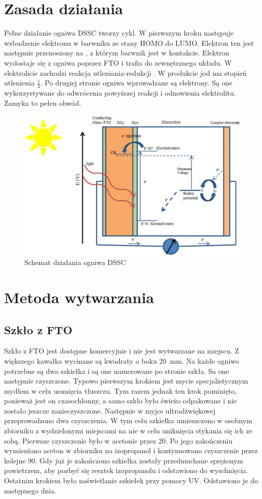 \documentclass[a4, 12pt]{article}
\begin{document}
	\section{Zasada działania}
	Pełne działanie ogniwa DSSC tworzy cykl. W pierwszym kroku następuje wzbudzenie elektronu w barwniku ze stany HOMO do LUMO. Elektron ten jest następnie przenoszony na , z którym barwnik jest w kontakcie. Elektron wydostaje się z ogniwa poprzez FTO i trafia do zewnętrznego układu. W elektrolicie zachodzi reakcja utleniania-redukcji . W produkcie jod ma stopień utlenienia $\frac{1}{3}$. Po drugiej stronie ogniwa wprowadzane są elektrony. Są one wykorzystywane do odwrócenia powyższej reakcji i odnowienia elektrolitu. Zamyka to pełen obwód. 
	\begin{figure}[H]
		\centering
		\includegraphics[width=\textwidth]{dssc.png}
		\caption{Schemat działania ogniwa DSSC \cite{dssc;fundamentals}}
	\end{figure}
	
	\section{Metoda wytwarzania}
	\subsection{Szkło z FTO}
	Szkło z FTO jest dostępne komercyjnie i nie jest wytwarzane na miejscu. Z większego kawałka wycinane są kwadraty o boku \qty{20}{\mm}. Na każde ogniwo potrzebne są dwa szkiełka i są one numerowane po stronie szkła. Sa one następnie czyszczone. Typowo pierwszym krokiem jest mycie specjalistycznym mydłem w celu usunięcia tłuszczu. Tym razem jednak ten krok pominięto, ponieważ jest on czasochłonny, a samo szkło było świeżo odpakowane i nie zostało jeszcze zanieczyszczone. Następnie w myjce ultradźwiękowej przeprowadzono dwa czyszczenia. W tym celu szkiełka umieszczono w osobnym zbiorniku z wydzielonymi miejscami na nie w celu uniknięcia stykania się ich ze sobą. Pierwsze czyszczenie było w acetonie przez \qty{20}{\min}. Po jego zakończeniu wymieniono aceton w zbiorniku na izopropanol i kontynuowano czyszczenie przez kolejne \qty{90}{\min}. Gdy już je zakończono szkiełka zostały przedmuchane sprężonym powietrzem, aby pozbyć się resztek izopropanolu i odstawiono do wyschnięcia. Ostatnim krokiem było naświetlanie szkiełek przy pomocy UV. Odstawiono je do następnego dnia. 
	
\end{document}

